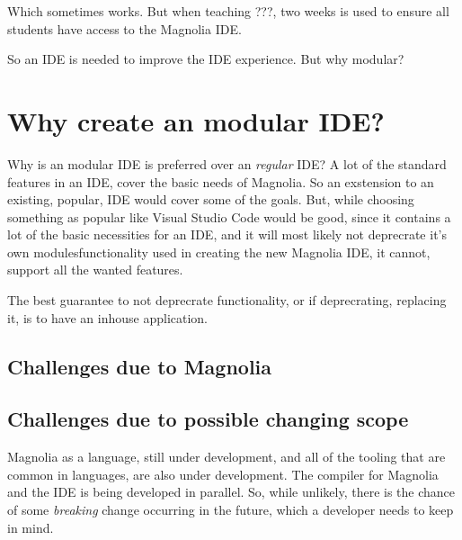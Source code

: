 \documentclass[runningheads]{llncs}
\begin{document}
Which sometimes works. But when teaching ???, two weeks is used to ensure all
students have access to the Magnolia IDE.


So an IDE is needed to improve the IDE experience. But why modular?

\section{Why create an modular IDE?}
Why is an modular IDE is preferred over an \textit{regular} IDE? A lot of the
standard features
in an IDE, cover the basic needs of Magnolia. So an exstension to an existing,
popular, IDE would cover some of the goals.
But, while choosing something as popular like Visual Studio Code would be good,
since it contains a lot of the basic necessities for an IDE, and it will most
likely not deprecrate it's own modules\/functionality used in creating the new
Magnolia IDE, it cannot, support all the wanted features. %

The best guarantee to not deprecrate functionality, or if deprecrating,
replacing it, is to have an inhouse application.

\subsection{Challenges due to Magnolia}

\subsection{Challenges due to possible changing scope}
Magnolia as a language, still under development, and all of the tooling that are
common in languages, are also under development. The compiler for Magnolia and
the IDE is being developed in parallel. So, while unlikely, there is the chance
of some \textit{breaking} change occurring in the future, which a developer
needs to keep in mind.
\end{document}
